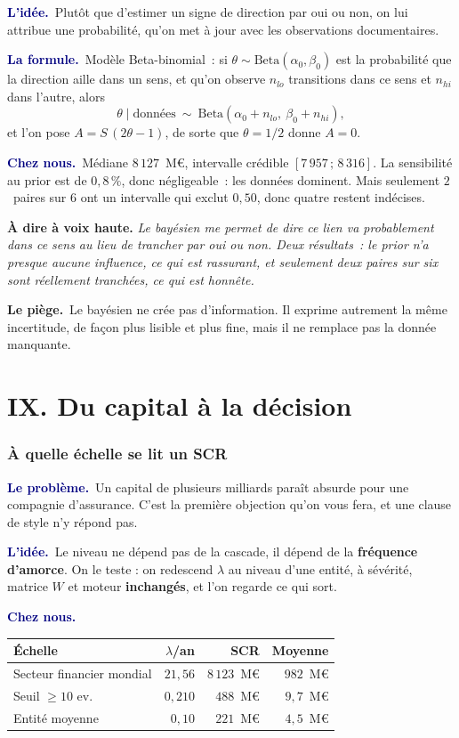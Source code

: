 \documentclass[11pt,a4paper]{article}
\newcommand{\lequoi}[1]{\smallskip\noindent\textcolor{navy}{\textbf{Le problème.}}\ #1\par}
\newcommand{\lidee}[1]{\smallskip\noindent\textcolor{navy}{\textbf{L'idée.}}\ #1\par}
\newcommand{\laformule}[1]{\smallskip\noindent\textcolor{navy}{\textbf{La formule.}}\ #1\par}
\newcommand{\cheznous}[1]{\smallskip\noindent\textcolor{navy}{\textbf{Chez nous.}}\ #1\par}
\newcommand{\lepiege}[1]{\smallskip\noindent\textcolor{accent}{\textbf{Le piège.}}\ #1\par}
\newcommand{\laphrase}[1]{\begin{phrasebox}\textbf{À dire à voix haute.} \emph{#1}\end{phrasebox}}
\begin{document}
\lidee{Plutôt que d'estimer un signe de direction par oui ou non, on lui attribue une
probabilité, qu'on met à jour avec les observations documentaires.}

\laformule{Modèle Beta-binomial~: si $\theta\sim\mathrm{Beta}(\alpha_0,\beta_0)$ est la
probabilité que la direction aille dans un sens, et qu'on observe $n_{lo}$ transitions dans
ce sens et $n_{hi}$ dans l'autre, alors
\[
  \theta \mid \text{données} \ \sim\ \mathrm{Beta}(\alpha_0+n_{lo},\ \beta_0+n_{hi}),
\]
et l'on pose $A = S\,(2\theta-1)$, de sorte que $\theta=1/2$ donne $A=0$.}

\cheznous{Médiane $8\,127$~M\euro, intervalle crédible $[7\,957\,;\,8\,316]$. La sensibilité
au prior est de $0{,}8\,\%$, donc négligeable~: les données dominent. Mais seulement
$2$~paires sur $6$ ont un intervalle qui exclut $0{,}50$, donc quatre restent indécises.}

\laphrase{Le bayésien me permet de dire \og ce lien va probablement dans ce sens\fg{} au lieu de
trancher par oui ou non. Deux résultats~: le prior n'a presque aucune influence, ce qui est
rassurant, et seulement deux paires sur six sont réellement tranchées, ce qui est honnête.}

\lepiege{Le bayésien ne crée pas d'information. Il exprime autrement la même incertitude, de
façon plus lisible et plus fine, mais il ne remplace pas la donnée manquante.}

\part*{IX. Du capital à la décision}

\section{À quelle échelle se lit un SCR}

\lequoi{Un capital de plusieurs milliards paraît absurde pour une compagnie d'assurance. C'est
la première objection qu'on vous fera, et une clause de style n'y répond pas.}

\lidee{Le niveau ne dépend pas de la cascade, il dépend de la \textbf{fréquence d'amorce}. On le
teste : on redescend $\lambda$ au niveau d'une entité, à sévérité, matrice $W$ et moteur
\textbf{inchangés}, et l'on regarde ce qui sort.}

\cheznous{\;\\[-6pt]
\begin{center}\small
\begin{tabular}{@{}l r r r@{}}
\toprule
\textbf{Échelle} & $\lambda$/an & \textbf{SCR} & \textbf{Moyenne} \\
\midrule
Secteur financier mondial & $21{,}56$ & $8\,123$~M\euro & $982$~M\euro \\
Seuil \og{}$\geq 10$ ev.\fg{} & $0{,}210$ & $488$~M\euro & $9{,}7$~M\euro \\
Entité moyenne & $0{,}10$ & $221$~M\euro & $4{,}5$~M\euro \\
\bottomrule
\end{tabular}
\end{center}}
\end{document}
